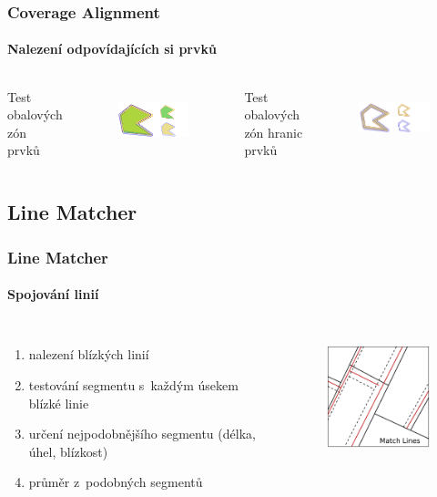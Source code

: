 \documentclass[unicode,bookmarksnumbered]{beamer}
\begin{document}
  \begin{frame}
  \frametitle{Coverage Alignment}
    \framesubtitle{Nalezení odpovídajících si prvků}
    \footnotesize 
    \begin{columns}[c]
	\column{2in}
	Test obalových zón prvků
	\begin{figure}
	  \centering
	    \includegraphics[width=2.5in]{./pictures/buffer-test.pdf}
	  \label{fig:ca1}
	  \end{figure}
	\column{2in}
	Test obalových zón hranic prvků
	  \begin{figure}
	  \centering
	    \includegraphics[width=2.5in]{./pictures/buffer-boundary.pdf}
	  \label{fig:ca2}
	  \end{figure}
    \end{columns}
  \end{frame}

  \subsection{Line Matcher} %
  \begin{frame}
  \frametitle{Line Matcher}
    \framesubtitle{Spojování linií}
     \begin{columns}[c]
	\column{2in}
	\begin{enumerate}
	    \item nalezení blízkých linií%
	    \item testování segmentu s~každým úsekem blízké linie
	    \item určení nejpodobnějšího segmentu
		  (délka, úhel, blízkost) 
	    \item průměr z~podobných segmentů
	\end{enumerate}
	\column{2in}
	  \begin{figure}
	  \centering
             \includegraphics[width=1.5in]{./pictures/match.pdf}
	  \label{fig:lm-princip}
	  \end{figure}
      \end{columns}
  \end{frame}
\end{document}
